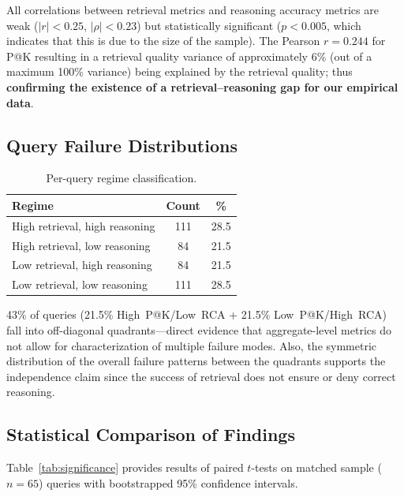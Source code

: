 \documentclass[11pt,a4paper]{article}
\begin{document}
All correlations between retrieval metrics and reasoning accuracy
metrics are weak ($|r|{<}0.25$, $|\rho|{<}0.23$) but statistically
significant ($p{<}0.005$, which indicates that this is due to the
size of the sample).
The Pearson $r{=}0.244$ for P@K resulting in a retrieval quality
variance of approximately 6\% (out of a maximum 100\% variance)
being explained by the retrieval quality; thus \textbf{confirming the
existence of a retrieval--reasoning gap for our empirical data}.

\subsection{Query Failure Distributions}

\begin{table}[h]
\centering
\small
\caption{Per-query regime classification.}
\label{tab:failure-modes}
\begin{tabular}{lcc}
\toprule
\textbf{Regime} & \textbf{Count} & \textbf{\%} \\
\midrule
High retrieval, high reasoning           & 111 & 28.5 \\
High retrieval, low reasoning            & 84 & 21.5 \\
Low retrieval, high reasoning            & 84 & 21.5 \\
Low retrieval, low reasoning             & 111 & 28.5 \\
\bottomrule
\end{tabular}
\end{table}

43\% of queries (21.5\% High~P@K/Low~RCA + 21.5\%
Low~P@K/High~RCA) fall into off-diagonal quadrants---direct
evidence that aggregate-level metrics do not allow for
characterization of multiple failure modes.
Also, the symmetric distribution of the overall failure patterns
between the quadrants supports the independence claim since the
success of retrieval does not ensure or deny correct reasoning.

\subsection{Statistical Comparison of Findings}

Table~\ref{tab:significance} provides results of paired $t$-tests
on matched sample ($n{=}65$) queries with bootstrapped 95\%
confidence intervals.
\end{document}
